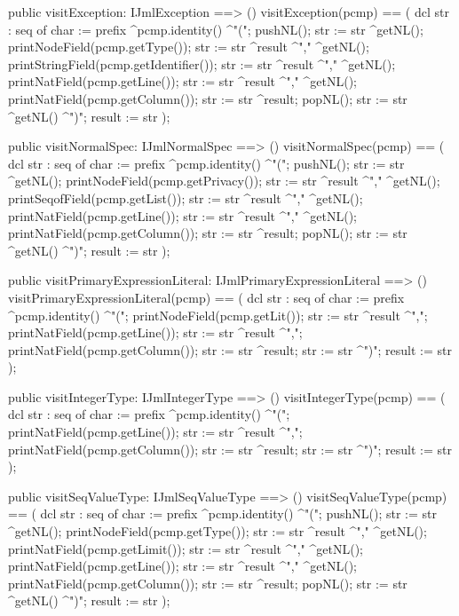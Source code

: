 \begin{vdm_al}
  public visitException: IJmlException ==> ()
  visitException(pcmp) ==
    ( dcl str : seq of char := prefix ^pcmp.identity() ^"(";
      pushNL();
      str := str ^getNL();
      printNodeField(pcmp.getType());
      str := str ^result ^"," ^getNL();
      printStringField(pcmp.getIdentifier());
      str := str ^result ^"," ^getNL();
      printNatField(pcmp.getLine());
      str := str ^result ^"," ^getNL();
      printNatField(pcmp.getColumn());
      str := str ^result;
      popNL();
      str := str ^getNL() ^")";
      result := str );

  public visitNormalSpec: IJmlNormalSpec ==> ()
  visitNormalSpec(pcmp) ==
    ( dcl str : seq of char := prefix ^pcmp.identity() ^"(";
      pushNL();
      str := str ^getNL();
      printNodeField(pcmp.getPrivacy());
      str := str ^result ^"," ^getNL();
      printSeqofField(pcmp.getList());
      str := str ^result ^"," ^getNL();
      printNatField(pcmp.getLine());
      str := str ^result ^"," ^getNL();
      printNatField(pcmp.getColumn());
      str := str ^result;
      popNL();
      str := str ^getNL() ^")";
      result := str );

  public visitPrimaryExpressionLiteral: IJmlPrimaryExpressionLiteral ==> ()
  visitPrimaryExpressionLiteral(pcmp) ==
    ( dcl str : seq of char := prefix ^pcmp.identity() ^"(";
      printNodeField(pcmp.getLit());
      str := str ^result ^",";
      printNatField(pcmp.getLine());
      str := str ^result ^",";
      printNatField(pcmp.getColumn());
      str := str ^result;
      str := str ^")";
      result := str );

  public visitIntegerType: IJmlIntegerType ==> ()
  visitIntegerType(pcmp) ==
    ( dcl str : seq of char := prefix ^pcmp.identity() ^"(";
      printNatField(pcmp.getLine());
      str := str ^result ^",";
      printNatField(pcmp.getColumn());
      str := str ^result;
      str := str ^")";
      result := str );

  public visitSeqValueType: IJmlSeqValueType ==> ()
  visitSeqValueType(pcmp) ==
    ( dcl str : seq of char := prefix ^pcmp.identity() ^"(";
      pushNL();
      str := str ^getNL();
      printNodeField(pcmp.getType());
      str := str ^result ^"," ^getNL();
      printNatField(pcmp.getLimit());
      str := str ^result ^"," ^getNL();
      printNatField(pcmp.getLine());
      str := str ^result ^"," ^getNL();
      printNatField(pcmp.getColumn());
      str := str ^result;
      popNL();
      str := str ^getNL() ^")";
      result := str );


\end{vdm_al}
